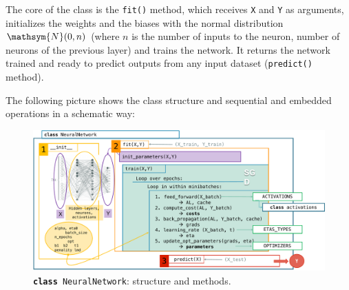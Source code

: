 \documentclass[english,notitlepage,reprint,nofootinbib]{revtex4-1}  %
\begin{document}
The core of the class is the \texttt{fit()} method, which receives \texttt{X} and \texttt{Y} as arguments, initializes the weights and the biases with the normal distribution $\mathsym{N}(0,n)$ (where $n$ is the number of inputs to the neuron, number of neurons of the previous layer) and trains the network. It returns the network trained and ready to predict outputs from any input dataset (\texttt{predict()} method).

The following picture shows the class structure and sequential and embedded operations in a schematic way:
\begin{figure}[h]
    \centering 
    \includegraphics[scale=0.23]{FFNN.pdf}
    \caption{\texttt{\textbf{class} NeuralNetwork}: structure and methods.}
    \label{fig:ffnn}
\end{figure}
\end{document}
